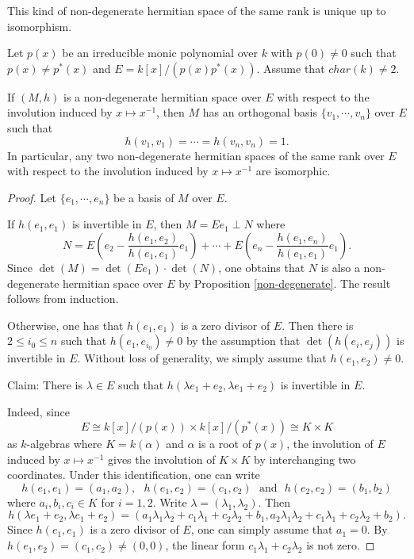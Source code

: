 \documentclass[12pt]{amsart}
\begin{document}
This kind of non-degenerate hermitian space of the same rank is unique up to isomorphism. 

\begin{prop} \label{orth-base}  Let $p(x)$ be an irreducible monic polynomial over $k$ with $p(0)\neq 0$ such that $p(x)\neq p^*(x)$ and $E=k[x]/(p(x)p^*(x))$.  Assume that $char(k)\neq 2$. 

If $(M, h)$ is a non-degenerate hermitian space over $E$ with respect to the involution induced by $x\mapsto x^{-1}$, then $M$ has an orthogonal basis $\{ v_1, \cdots, v_n \}$ over $E$ such that $$ h(v_1, v_1) = \cdots = h(v_n, v_n) =1. $$ In particular,  any two non-degenerate hermitian spaces of the same rank over $E$ with respect to the involution induced by $x\mapsto x^{-1}$ are isomorphic. 
\end{prop}
\begin{proof} Let $\{ e_1, \cdots, e_n \}$ be a basis of $M$ over $E$. 

If $h(e_1, e_1)$ is invertible in $E$, then $M= E e_1 \perp N$ where 
$$ N= E(e_2- \frac{h(e_1, e_2)}{h(e_1, e_1)} e_1)+  \cdots + E(e_n- \frac{h(e_1, e_n)}{h(e_1, e_1)} e_1). $$
Since $\det (M) = \det (Ee_1) \cdot \det (N)$, one obtains that $N$ is also a non-degenerate hermitian space over $E$ by Proposition \ref{non-degenerate}. The result follows from induction.

Otherwise, one has that $h(e_1, e_1)$ is a zero divisor of $E$. Then there is $2\leq i_0\leq n$ such that $h(e_1, e_{i_0})\neq 0$ by the assumption that $\det (h(e_i, e_j))$ is invertible in $E$. Without loss of generality, we simply assume that $h(e_1, e_2)\neq 0$.  

Claim: There is $\lambda\in E$ such that $h(\lambda e_1+ e_2, \lambda e_1+  e_2)$ is invertible in $E$. 

Indeed, since 
$$ E\cong k[x]/(p(x)) \times k[x]/(p^*(x)) \cong K\times K $$
as $k$-algebras where $K=k(\alpha)$ and $\alpha$ is a root of $p(x)$, the involution of $E$ induced by $x\mapsto x^{-1}$ gives the involution of $K\times K$ by interchanging two coordinates.  Under this identification, one can write 
$$ h(e_1, e_1)= (a_1, a_2), \ \ \ h(e_1, e_2) = (c_1, c_2) \ \ \ \text{and} \ \ \ h(e_2, e_2) =(b_1, b_2)$$  
where $a_i, b_i, c_i\in K$ for $i=1, 2$.  Write $\lambda= (\lambda_1, \lambda_2)$. Then 
$$ h(\lambda e_1+ e_2, \lambda e_1+ e_2)=(a_1\lambda_1\lambda_2+c_1\lambda_1+c_2\lambda_2+b_1, a_2\lambda_1\lambda_2+ c_1\lambda_1+c_2\lambda_2+b_2).$$
Since $h(e_1, e_1)$ is a zero divisor of $E$, one can simply assume that $a_1=0$.  By $h(e_1, e_2)= (c_1, c_2)\neq (0, 0)$, the linear form $c_1\lambda_1+c_2\lambda_2$ is not zero. 


\end{proof}
\end{document}
